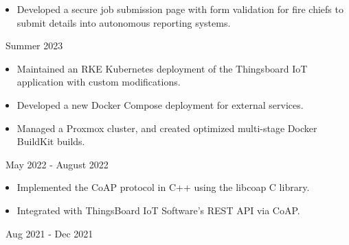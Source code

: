 \documentclass[11pt,letterpaper,ragged2e]{altacv}
\begin{document}

\hfuzz=5pt %

\begin{fullwidth}
	\makecvheader
\end{fullwidth}




{
	\begin{itemize}
		\item Developed a secure job submission page with form validation for fire chiefs to submit details into autonomous reporting systems.
	\end{itemize}
}
{\faCalendar\, Summer 2023}
{
}


{
	\begin{itemize}
		\item Maintained an RKE Kubernetes deployment of the Thingsboard IoT application with custom modifications.
		\item Developed a new Docker Compose deployment for external services.
		\item Managed a Proxmox cluster, and created optimized multi-stage Docker BuildKit builds.
	\end{itemize}
}
{\faCalendar\, May 2022 - August 2022}
{
}

{
	\begin{itemize}
		\item Implemented the CoAP protocol in C++ using the libcoap C library.
		\item Integrated with ThingsBoard IoT Software's REST API via CoAP.
	\end{itemize}
}
{\faCalendar\, Aug 2021 - Dec 2021}
{
}
\end{document}
